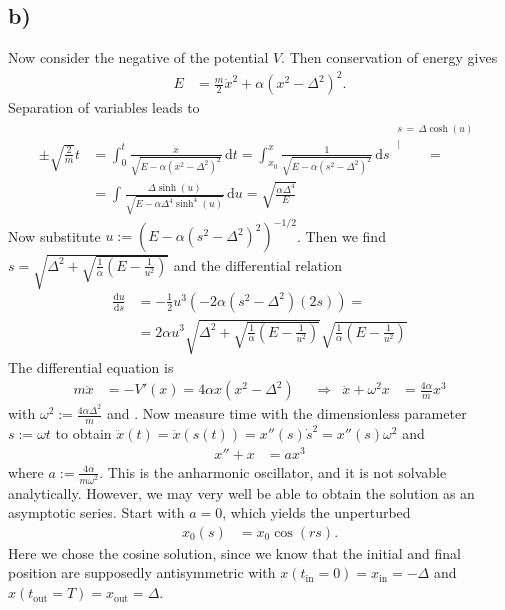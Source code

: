 \documentclass[english, parskip=full]{scrartcl}
\newcommand{\kom}{}
\newcommand{\intx}{}
\newcommand{\kla}{}
\newcommand{\tecxt}{}
\begin{document}
\subsection*{b)}
Now consider the negative of the potential $V$.
Then conservation of energy gives
\begin{align}
E &= \frac{m}{2}\dot{x}^2 + \alpha (x^2-\Delta^2)^2.
\end{align}
Separation of variables leads to
\begin{align}
\pm\sqrt{\frac{2}{m}} t &= \intx\int_{0}^{t}\frac{\dot{x}}{\sqrt{E - \alpha (x^2 - \Delta^2)^2}}\, \mathrm{d}t = \intx\int_{x_0}^{x}\frac{1}{\sqrt{E - \alpha (s^2 - \Delta^2)^2}}\, \mathrm{d}s \kom\overset{\substack{{s\,=\,\Delta\cosh (u)} \\ |}}{=} \\
&= \intx\int_{ }^{ }\frac{\Delta \sinh (u)}{\sqrt{E - \alpha\Delta^4 \sinh^4(u)}}\, \mathrm{d}u = \sqrt{\frac{\alpha\Delta^4}{E}}
\end{align}
Now substitute $u := \kla\left( E - \alpha(s^2-\Delta^2)^2 \right)^{-1/2}$.
Then we find $s = \sqrt{\Delta^2 + \sqrt{\frac{1}{\alpha}\kla\left( E - \frac{1}{u^2} \right)}}$ and the differential relation
\begin{align}
\frac{\tecxt\text{d}u}{\tecxt\text{d}s} &= -\frac{1}{2}u^3\kla\left( -2\alpha (s^2-\Delta^2)(2s) \right) = \\
&= 2\alpha u^3 \sqrt{\Delta^2 + \sqrt{\frac{1}{\alpha}\kla\left( E - \frac{1}{u^2} \right)}}\sqrt{\frac{1}{\alpha}\kla\left( E - \frac{1}{u^2} \right)}
\end{align}
The differential equation is
\begin{align}
m\ddot{x} &= -V'(x) = 4\alpha x (x^2-\Delta^2) &&\Rightarrow & \ddot{x} + \omega^2x &= \frac{4\alpha}{m} x^3
\end{align}
with $\omega^2 := \frac{4\alpha\Delta^2}{m} $ and .
Now measure time with the dimensionless parameter $s := \omega t$ to obtain $\ddot{x}(t) = \ddot{x}(s(t)) = x''(s) \dot{s}^2 = x''(s)\omega^2$ and
\begin{align}
x'' + x &= ax^3
\end{align}
where $a := \frac{4\alpha}{m\omega^2}$.
This is the anharmonic oscillator, and it is not solvable analytically.
However, we may very well be able to obtain the solution as an asymptotic series.
Start with $a=0$, which yields the unperturbed
\begin{align}
x_0(s) &= x_0\cos (rs).
\end{align}
Here we chose the cosine solution, since we know that the initial and final position are supposedly antisymmetric with $x(t_\tecxt\text{in}=0) = x_\tecxt\text{in} = -\Delta$ and $x(t_\tecxt\text{out}=T) = x_\tecxt\text{out} = \Delta$.
\end{document}
